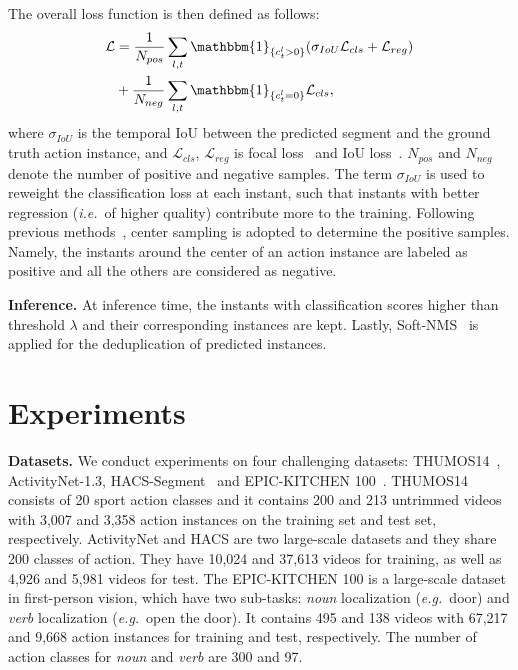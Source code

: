 \documentclass[10pt,twocolumn,letterpaper]{article}
\def\ie{{\em i.e.}}
\def\eg{{\em e.g.}}
\newcommand{\myPara}[1]{\vspace{.05in}\noindent\textbf{#1}}
\newcommand{\mc}[1]{\mathcal{#1}}
\begin{document}
The overall loss function is then defined as follows:
\begin{align}
\begin{aligned}
\mc{L}&=\frac{1}{N_{pos}}\sum_{l,t}\mathbbm{1}_{\{c^l_t>0\}}(\sigma_{IoU}\mc{L}_{cls} + \mc{L}_{reg})\\
&+ \frac{1}{N_{neg}}\sum_{l,t}\mathbbm{1}_{\{c^l_t=0\}}\mc{L}_{cls},
\end{aligned}
\end{align}
where $\sigma_{IoU}$ is the temporal IoU between the predicted segment and the ground truth action instance, and $\mc{L}_{cls}$, $\mc{L}_{reg}$ is focal loss~\cite{lin2017focal} and IoU loss~\cite{rezatofighi2019generalized}. $N_{pos}$ and $N_{neg}$ denote the number of positive and negative samples.
The term $\sigma_{IoU}$ is used to reweight the classification loss at each instant, such that instants with better regression (\ie~of higher quality) contribute more to the training. 
Following previous methods~\cite{tian2019fcos,zhang2020bridging,zhang2022actionformer}, center sampling is adopted to determine the positive samples. Namely, the instants around the center of an action instance are labeled as positive and all the others are considered as negative.

\myPara{Inference.} At inference time, the instants with classification scores higher than threshold $\lambda$ and their corresponding instances are kept. Lastly, Soft-NMS~\cite{bodla2017soft} is applied for the deduplication of predicted instances.




\section{Experiments}
\label{sec:exp}
\myPara{Datasets.}
We conduct experiments on four challenging datasets: THUMOS14~\cite{THUMOS14}, ActivityNet-1.3\cite{caba2015activitynet}, HACS-Segment~\cite{zhao2019hacs} and EPIC-KITCHEN 100~\cite{Damen2022RESCALING}. THUMOS14 consists of 20 sport action classes and it contains 200 and 213 untrimmed videos with 3,007 and 3,358 action instances on the training set and test set, respectively. ActivityNet and HACS are two large-scale datasets and they share 200 classes of action. They have 10,024 and 37,613 videos for training, as well as 4,926 and 5,981 videos for test. The EPIC-KITCHEN 100 is a large-scale dataset in first-person vision, which have two sub-tasks: \emph{noun} localization (\eg~door) and \emph{verb} localization (\eg~open the door). It contains 495 and 138 videos with 67,217 and 9,668 action instances for training and test, respectively. The number of action classes for \emph{noun} and \emph{verb} are 300 and 97.  
\end{document}
